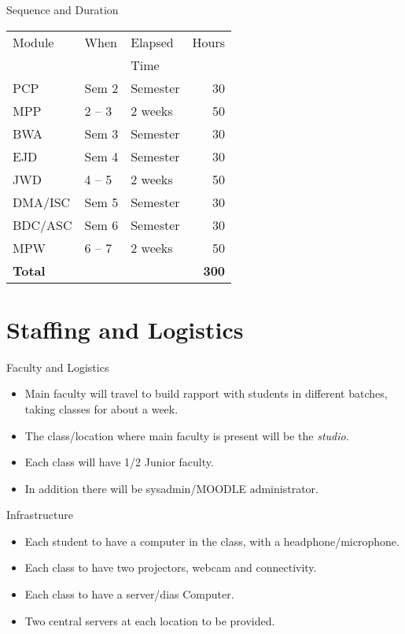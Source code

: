 \documentclass[12pt]{beamer}
\begin{document}
{\begin{frame}{Sequence and Duration}
  \begin{tabular}{|l|l|l|r|} \hline
    Module & When   & Elapsed  & Hours \\
           &        & Time     &       \\\hline\hline
    PCP    & Sem 2  & Semester & 30    \\\hline
    \alert{MPP}   & \alert{2 -- 3}& \alert{2 weeks} & \alert{50}   \\\hline
    BWA    & Sem 3  & Semester & 30    \\\hline
    EJD   & Sem 4  & Semester & 30    \\\hline
    \alert{JWD}   & \alert{4 -- 5}& \alert{2 weeks} & \alert{50}    \\\hline
    DMA/ISC    & Sem 5  & Semester & 30    \\\hline
    BDC/ASC    & Sem 6  & Semester & 30    \\\hline
    \alert{MPW}   & \alert{6 -- 7}& \alert{2 weeks} & \alert{50}   \\\hline\hline
    \textbf{Total} &        &          & \textbf{300}  \\\hline\hline
  \end{tabular}
\end{frame}

\section{Staffing and Logistics}
\begin{frame}{Faculty and Logistics}
  \begin{itemize}
  \item Main faculty will travel to build rapport with students in different batches, taking classes for about a week.
  \item The class/location where main faculty is present will be the \emph{studio}.
  \item Each class will have 1/2 Junior faculty.
  \item In addition there will be sysadmin/MOODLE administrator.
  \end{itemize}
\end{frame}

\begin{frame}{Infrastructure}
  \begin{itemize}
  \item Each student to have a computer in the class, with a headphone/microphone.
  \item Each class to have two projectors, webcam and connectivity.
  \item Each class to have a server/dias Computer.
  \item Two central servers at each location to be provided.
\end{itemize}  
\end{frame}

}
\end{document}
